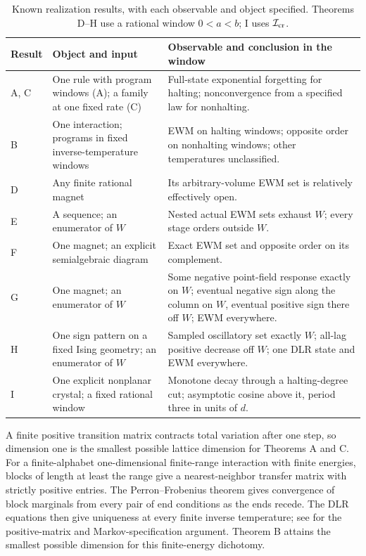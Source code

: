 \begin{table}[ht]
\centering\small
\begin{tabular}{@{}p{.09\linewidth}p{.30\linewidth}p{.52\linewidth}@{}}
\toprule
Result & Object and input & Observable and conclusion in the window \\
\midrule
A, C & One rule with program windows (A); a family at one fixed rate (C) & Full-state exponential forgetting for halting; nonconvergence from a specified law for nonhalting. \\
B & One interaction; programs in fixed inverse-temperature windows & EWM on halting windows; opposite order on nonhalting windows; other temperatures unclassified. \\
D & Any finite rational magnet & Its arbitrary-volume EWM set is relatively effectively open. \\
E & A sequence; an enumerator of \(W\) & Nested actual EWM sets exhaust \(W\); every stage orders outside \(W\). \\
F & One magnet; an explicit semialgebraic diagram & Exact EWM set and opposite order on its complement. \\
G & One magnet; an enumerator of \(W\) & Some negative point-field response exactly on \(W\); eventual negative sign along the column on \(W\), eventual positive sign there off \(W\); EWM everywhere. \\
H & One sign pattern on a fixed Ising geometry; an enumerator of \(W\) & Sampled oscillatory set exactly \(W\); all-lag positive decrease off \(W\); one DLR state and EWM everywhere. \\
I & One explicit nonplanar crystal; a fixed rational window & Monotone decay through a halting-degree cut; asymptotic cosine above it, period three in units of \(d\). \\
\bottomrule
\end{tabular}
\caption{Known realization results, with each observable and object specified. Theorems D--H use a rational window \(0<a<b\); I uses \(\mathcal I_{\rm cr}\).}\label{tab:scope}
\end{table}

A finite positive transition matrix contracts total variation after one step, so dimension one is the smallest possible lattice dimension for Theorems A and C. For a finite-alphabet one-dimensional finite-range interaction with finite energies, blocks of length at least the range give a nearest-neighbor transfer matrix with strictly positive entries. The Perron--Frobenius theorem gives convergence of block marginals from every pair of end conditions as the ends recede. The DLR equations then give uniqueness at every finite inverse temperature; see \cite[Chapter~3]{georgii} for the positive-matrix and Markov-specification argument. Theorem B attains the smallest possible dimension for this finite-energy dichotomy.

